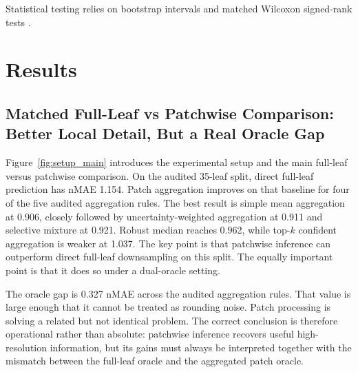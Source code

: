 \documentclass[11pt,a4paper]{article}
\newcommand{\nmae}{nMAE}
\begin{document}
Statistical testing relies on bootstrap intervals and matched Wilcoxon signed-rank tests \citep{B_efron1979,B_wilcoxon1945}.

\section{Results}
\subsection{Matched Full-Leaf vs Patchwise Comparison: Better Local Detail, But a Real Oracle Gap}
Figure~\ref{fig:setup_main} introduces the experimental setup and the main full-leaf versus patchwise comparison.
On the audited 35-leaf split, direct full-leaf prediction has \nmae{} 1.154.
Patch aggregation improves on that baseline for four of the five audited aggregation rules.
The best result is simple mean aggregation at 0.906, closely followed by uncertainty-weighted aggregation at 0.911 and selective mixture at 0.921.
Robust median reaches 0.962, while top-$k$ confident aggregation is weaker at 1.037.
The key point is that patchwise inference can outperform direct full-leaf downsampling on this split.
The equally important point is that it does so under a dual-oracle setting.

The oracle gap is 0.327 \nmae{} across the audited aggregation rules.
That value is large enough that it cannot be treated as rounding noise.
Patch processing is solving a related but not identical problem.
The correct conclusion is therefore operational rather than absolute: patchwise inference recovers useful high-resolution information, but its gains must always be interpreted together with the mismatch between the full-leaf oracle and the aggregated patch oracle.
\end{document}
